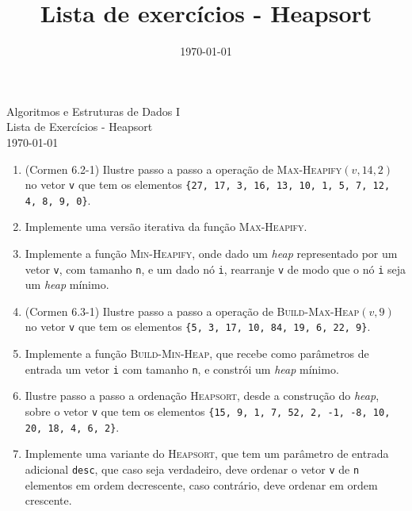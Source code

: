 \documentclass[a4paper, 12pt]{article}
\title{Lista de exercícios - Heapsort}
\date{\today}
\begin{document}
  \begin{center}
    {\LARGE Algoritmos e Estruturas de Dados I} \\[1em]
    {\large Lista de Exercícios - Heapsort} \\[1em]
    {\large\today}
  \end{center}

  \vspace{1em}

  \begin{enumerate}
    \item (Cormen 6.2-1) Ilustre passo a passo a operação de
    \textsc{Max-Heapify}$(v,14,2)$ no vetor  \texttt{v} que tem os
     elementos \texttt{\{27, 17, 3, 16, 13, 10, 1, 5, 7, 12, 4, 8, 9, 0\}}.

    \item Implemente uma versão iterativa da função \textsc{Max-Heapify}.

    \item Implemente a função \textsc{Min-Heapify}, onde dado um
    \emph{heap} representado por um vetor \texttt{v}, com tamanho
    \texttt{n}, e um dado nó \texttt{i}, rearranje \texttt{v}
    de modo que o nó \texttt{i} seja um \emph{heap} mínimo.

    \item (Cormen 6.3-1) Ilustre passo a passo a operação de
    \textsc{Build-Max-Heap}$(v,9)$ no vetor \texttt{v} que tem os
    elementos \texttt{\{5, 3, 17, 10, 84, 19, 6, 22, 9\}}.

    \item Implemente a função \textsc{Build-Min-Heap}, que
    recebe como parâmetros de entrada um vetor \texttt{i} com
    tamanho \texttt{n}, e constrói um \emph{heap} mínimo.

    \item Ilustre passo a passo a ordenação \textsc{Heapsort},
    desde a construção do \emph{heap},
    sobre o vetor \texttt{v} que tem os elementos 
    \texttt{\{15, 9, 1, 7, 52, 2, -1, -8, 10, 20, 18, 4, 6, 2\}}.

    \item Implemente uma variante do \textsc{Heapsort}, que tem
    um parâmetro de entrada adicional \texttt{desc}, que caso
    seja verdadeiro, deve ordenar o vetor \texttt{v} de \texttt{n}
    elementos em ordem decrescente, caso contrário, deve ordenar em
    ordem crescente.
  \end{enumerate}
\end{document}
